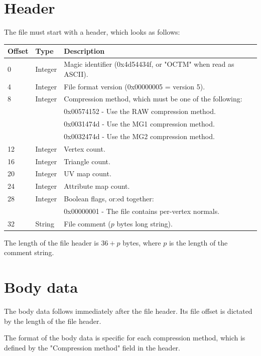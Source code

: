 
\chapter{Header}
The file must start with a header, which looks as follows:

\begin{tabular}{|l|l|l|}\hline
\textbf{Offset} &  \textbf{Type} & \textbf{Description}\\ \hline
0 & Integer & Magic identifier (0x4d54434f, or "OCTM" when read as ASCII).\\ \hline
4 & Integer & File format version (0x00000005 = version 5).\\ \hline
8 & Integer & Compression method, which must be one of the following:\\
 & & 0x00574152 - Use the RAW compression method.\\
 & & 0x0031474d - Use the MG1 compression method.\\
 & & 0x0032474d - Use the MG2 compression method.\\ \hline
12 & Integer & Vertex count.\\ \hline
16 & Integer & Triangle count.\\ \hline
20 & Integer & UV map count.\\ \hline
24 & Integer & Attribute map count.\\ \hline
28 & Integer & Boolean flags, or:ed together:\\
 & & 0x00000001 - The file contains per-vertex normals.\\ \hline
32 & String & File comment ($p$ bytes long string).\\ \hline
\end{tabular}

The length of the file header is $36+p$ bytes, where $p$ is the length of the
comment string.



\chapter{Body data}
The body data follows immediately after the file header. Its file offset is
dictated by the length of the file header.

The format of the body data is specific for each compression method, which is
defined by the "Compression method" field in the header.

